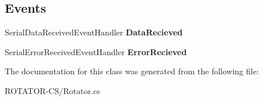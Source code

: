 \subsection*{Events}
\begin{DoxyCompactItemize}
\item 
\mbox{\label{class_r_o_t_a_t_o_r___c_s_1_1_rotator_af996774a76c727eac4ba965c5c6f52f1}} 
Serial\+Data\+Received\+Event\+Handler {\bfseries Data\+Recieved}
\item 
\mbox{\label{class_r_o_t_a_t_o_r___c_s_1_1_rotator_a32593285a910a490c305b6638c6b511a}} 
Serial\+Error\+Received\+Event\+Handler {\bfseries Error\+Recieved}
\end{DoxyCompactItemize}


The documentation for this class was generated from the following file\+:\begin{DoxyCompactItemize}
\item 
R\+O\+T\+A\+T\+O\+R-\/\+C\+S/Rotator.\+cs\end{DoxyCompactItemize}
